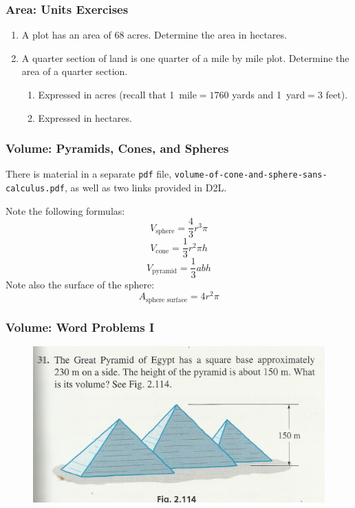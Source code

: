 \documentclass[xcolor=dvipsnames]{beamer}
\begin{document}
\begin{frame}
  \frametitle{Area: Units Exercises}
  \begin{enumerate}
  \item A plot has an area of 68 acres. Determine the area in
    hectares.
  \item A quarter section of land is one quarter of a mile by mile
    plot. Determine the area of a quarter section.
    \begin{enumerate}[a]
    \item Expressed in acres (recall that \mbox{1 mile}$=1760$ yards
      and \mbox{1 yard}$=3$ feet).
    \item Expressed in hectares.
    \end{enumerate}
  \end{enumerate}
\end{frame}

\begin{frame}
  \frametitle{Volume: Pyramids, Cones, and Spheres}
There is material in a separate \texttt{pdf} file,
\texttt{volume-of-cone-and-sphere-sans-calculus.pdf}, as well as two
links provided in D2L.

Note the following formulas:
\begin{equation}
  \label{eq:joyakuap}
  V_{\mbox{sphere}}=\frac{4}{3}r^{3}\pi
\end{equation}
\begin{equation}
  \label{eq:ahquieye}
  V_{\mbox{cone}}=\frac{1}{3}r^{2}\pi{}h
\end{equation}
\begin{equation}
  \label{eq:kooshogu}
  V_{\mbox{pyramid}}=\frac{1}{3}abh
\end{equation}
Note also the surface of the sphere:
\begin{equation}
  \label{eq:aighaing}
  A_{\mbox{sphere surface}}=4r^{2}\pi
\end{equation}
\end{frame}

\begin{frame}
  \frametitle{Volume: Word Problems I}
  \begin{figure}[h]
    \includegraphics[scale=1]{./volume1.png}
  \end{figure}
\end{frame}
\end{document}
